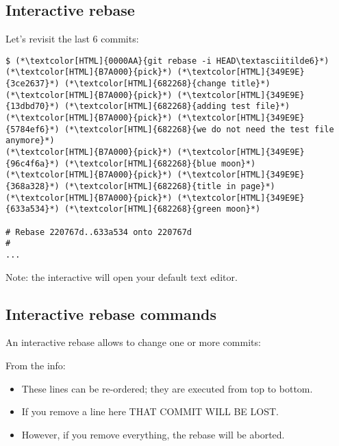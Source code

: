 \subsection{Interactive rebase}
\begin{frame}[fragile]
  \subslidetitle

  Let's revisit the last 6 commits:
  \begin{lstlisting}
$ (*\textcolor[HTML]{0000AA}{git rebase -i HEAD\textasciitilde6}*)
(*\textcolor[HTML]{B7A000}{pick}*) (*\textcolor[HTML]{349E9E}{3ce2637}*) (*\textcolor[HTML]{682268}{change title}*)
(*\textcolor[HTML]{B7A000}{pick}*) (*\textcolor[HTML]{349E9E}{13dbd70}*) (*\textcolor[HTML]{682268}{adding test file}*)
(*\textcolor[HTML]{B7A000}{pick}*) (*\textcolor[HTML]{349E9E}{5784ef6}*) (*\textcolor[HTML]{682268}{we do not need the test file anymore}*)
(*\textcolor[HTML]{B7A000}{pick}*) (*\textcolor[HTML]{349E9E}{96c4f6a}*) (*\textcolor[HTML]{682268}{blue moon}*)
(*\textcolor[HTML]{B7A000}{pick}*) (*\textcolor[HTML]{349E9E}{368a328}*) (*\textcolor[HTML]{682268}{title in page}*)
(*\textcolor[HTML]{B7A000}{pick}*) (*\textcolor[HTML]{349E9E}{633a534}*) (*\textcolor[HTML]{682268}{green moon}*)

# Rebase 220767d..633a534 onto 220767d
#
...
\end{lstlisting}
  \vspace{1em}
  Note: the interactive  will open your default text editor.
\end{frame}

\subsection{Interactive rebase commands}
\begin{frame}[fragile]
  \subslidetitle

  An interactive rebase allows to change one or more commits:

  \begin{itemize}
    \pause
    \pause
    \pause
    \pause
    \pause
  \end{itemize}

  \pause
  \vspace{1em}
  From the  info:
  \begin{itemize}
    \item These lines can be re-ordered; they are executed from top to bottom.
    \item If you remove a line here THAT COMMIT WILL BE LOST.
    \item However, if you remove everything, the rebase will be aborted.
  \end{itemize}

\end{frame}

